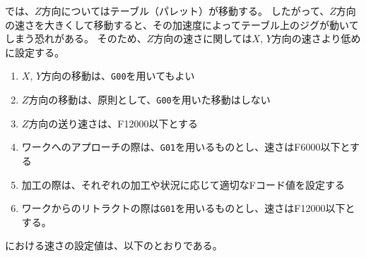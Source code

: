 \DMname では、$Z$方向についてはテーブル（パレット）が移動する。
したがって、$Z$方向の速さを大きくして移動すると、その加速度によってテーブル上のジグが動いてしまう恐れがある。
そのため、$Z$方向の速さに関しては$X$, $Y$方向の速さより低めに設定する。
\begin{enumerate}[label=\Roman*., ref=\Roman*]
\item $X$, $Y$方向の移動は、\verb|G00|を用いてもよい
\item $Z$方向の移動は、原則として、\verb|G00|を用いた移動はしない
\item $Z$方向の送り速さは、F12000以下とする
\item ワークへのアプローチの際は、\verb|G01|を用いるものとし、速さはF6000以下とする
\item 加工の際は、それぞれの加工や状況に応じて適切なFコード値を設定する
\item ワークからのリトラクトの際は\verb|G01|を用いるものとし、速さはF12000以下とする。
\end{enumerate}


\clearpage
\dateKouguSpeed における速さの設定値は、以下のとおりである。\\

